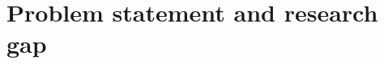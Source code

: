 \section{Problem statement and research gap}
\label{sec:introduction:problem-statement-research-gap}
